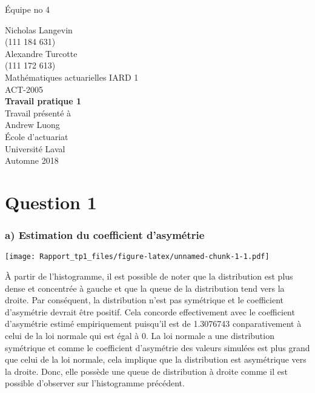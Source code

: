 \documentclass[]{article}
\title{}
\author{}
\date{}
\begin{document}
\newpage

\begin{flushright}
    Équipe no 4 
\end{flushright}

\begin{center}
    \vspace{5\baselineskip}
    Nicholas Langevin \\
    (111 184 631) \\
    \vspace{2\baselineskip}
    Alexandre Turcotte \\
    (111 172 613) \\
    \vspace{8\baselineskip}
    Mathématiques actuarielles IARD 1 \\
    ACT-2005 \\
    \vspace{8\baselineskip}
    \textbf{Travail pratique 1} \\
    \vspace{8\baselineskip}
    Travail présenté à \\
    Andrew Luong \\
    \vspace{8\baselineskip}
    École d’actuariat \\
    Université Laval \\
    Automne 2018
\end{center}

\section{Question 1}\label{question-1}

\subsubsection{a) Estimation du coefficient
d'asymétrie}\label{a-estimation-du-coefficient-dasymetrie}

\texttt{[image: Rapport\_tp1\_files/figure-latex/unnamed-chunk-1-1.pdf]}

À partir de l'histogramme, il est possible de noter que la distribution
est plus dense et concentrée à gauche et que la queue de la distribution
tend vers la droite. Par conséquent, la distribution n'est pas
symétrique et le coefficient d'asymétrie devrait être positif. Cela
concorde effectivement avec le coefficient d'asymétrie estimé
empiriquement puisqu'il est de 1.3076743 conparativement à celui de la
loi normale qui est égal à 0. La loi normale a une distribution
symétrique et comme le coefficient d'asymétrie des valeurs simulées est
plus grand que celui de la loi normale, cela implique que la
distribution est asymétrique vers la droite. Donc, elle possède une
queue de distribution à droite comme il est possible d'observer sur
l'histogramme précédent.
\end{document}
